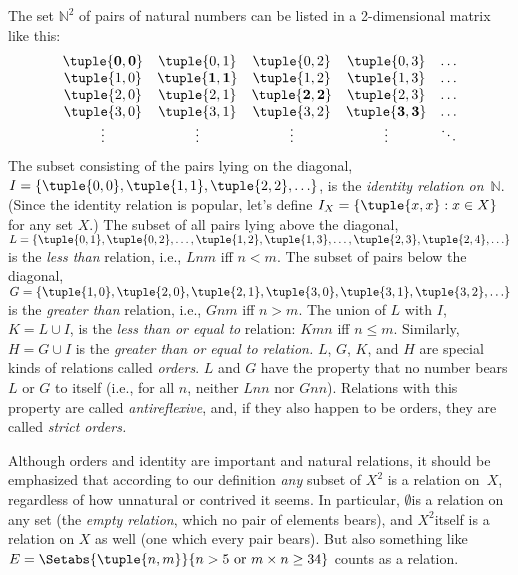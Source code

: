\documentclass[../../include/open-logic-section]{subfiles}
\begin{document}
\begin{ex}
The set $\mathbb{N}^{2}$ of
pairs of natural numbers can be listed in a 2-dimensional matrix like
this:
\[
\begin{array}{ccccc}
\mathbf{\tuple{ 0,0 }} & \tuple{ 0,1 } & 
  \tuple{ 0,2 } & \tuple{ 0,3 } & \ldots\\ 
\tuple{ 1,0 } & \mathbf{\tuple{ 1,1 }} & 
  \tuple{ 1,2 } & \tuple{ 1,3 } & \ldots\\ 
\tuple{ 2,0 } & \tuple{ 2,1 } & 
  \mathbf{\tuple{ 2,2 }} & \tuple{ 2,3 } & \ldots\\ 
\tuple{ 3,0 } & \tuple{ 3,1 } & \tuple{ 3,2 } &
  \mathbf{\tuple{ 3,3 }} & \ldots\\ 
\vdots & \vdots & \vdots & \vdots & \mathbf{\ddots}
\end{array}
\]
The subset consisting of the pairs lying on the diagonal, $I=\{\tuple{
0,0 }, \tuple{ 1,1 },\tuple{ 2,2 },\ldots\}$, is the
\emph{identity relation on}~$\mathbb{N}$. (Since the identity
relation is popular, let's define $I_{X}=\{\tuple{ x,x }:x\in
X\}$ for any set $X$.) The subset of all pairs lying above the
diagonal, $L=\{\tuple{ 0,1 },\tuple{ 0,2 },\ldots,\tuple{
1,2 },\tuple{ 1,3 },\ldots,\tuple{ 2,3 },\tuple{ 2,4
},\ldots\}$ is the \emph{less than} relation, i.e., $Lnm$ iff
$n<m$. The subset of pairs below the diagonal, $G=\{\tuple{ 1,0
},\tuple{ 2,0 },\tuple{ 2,1 },\tuple{ 3,0
},\tuple{ 3,1 },\tuple{ 3,2 },\ldots\}$ is the
\emph{greater than} relation, i.e., $Gnm$ iff $n>m$. The union of $L$
with $I$, $K=L\cup I$, is the \emph{less than or equal to} relation:
$Kmn$ iff $n\le m$. Similarly, $H=G\cup I$ is the \emph{greater than
  or equal to relation.} $L$, $G$, $K$, and $H$ are special kinds of
relations called \emph{orders}. $L$ and $G$ have the property that no
number bears $L$ or $G$ to itself (i.e., for all $n$, neither $Lnn$
nor $Gnn$). Relations with this property are called
\emph{antireflexive}, and, if they also happen to be orders, they are
called \emph{strict orders.}

Although orders and identity are important and natural relations, it
should be emphasized that according to our definition \emph{any}
subset of $X^{2}$ is a relation on~$X$, regardless of how unnatural or
contrived it seems. In particular, $\emptyset$is a relation on any set
(the \emph{empty relation}, which no pair of elements bears), and
$X^{2}$itself is a relation on $X$ as well (one which every pair
bears). But also something like $E=\Setabs{\tuple{n, m}}{n>5 \text{ or
  } m \times n \ge 34}$ counts as a relation.
\end{ex}
\end{document}
